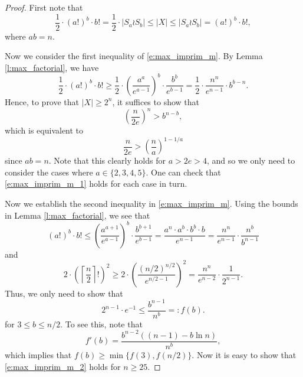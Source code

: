 \documentclass[twoside,a4paper,reqno,11pt]{amsart}
\newcommand{\<}{\langle}
\renewcommand{\>}{\rangle}
\newcommand{\leqs}{\leqslant}
\newcommand{\geqs}{\geqslant}
\theoremstyle{definition}
\begin{document}
	\begin{proof}
		First note that
		\begin{equation*}
		\frac{1}{2}\cdot (a!)^b\cdot b! = \frac{1}{2}\cdot|S_a\wr S_b|\leqs |X|\leqs |S_a\wr S_b| = (a!)^b\cdot b!,
		\end{equation*}
		where $ab = n$.
		
		Now we consider the first inequality of \eqref{e:max_imprim_m}. By Lemma \ref{l:max_factorial}, we have
		\begin{equation*}
		\frac{1}{2}\cdot (a!)^b\cdot b! \geqs \frac{1}{2}\cdot\left(\frac{a^a}{e^{a-1}}\right)^b\cdot \frac{b^b}{e^{b-1}} = \frac{1}{2}\cdot \frac{n^n}{e^{n-1}}\cdot b^{b-n}.
		\end{equation*}
		Hence, to prove that $|X|\geqs 2^n$, it suffices to show that
		\begin{equation*}
		\left(\frac{n}{2e}\right)^n > b^{n-b},
		\end{equation*}
		which is equivalent to
		\begin{equation}
		\label{e:max_imprim_m_1}
		\frac{n}{2e} > \left(\frac{n}{a}\right)^{1-1/a}
		\end{equation}
		since $ab = n$.	Note that this clearly holds for $a > 2e > 4$, and so we only need to consider the cases where $a \in\{2,3,4,5\}$. One can check that \eqref{e:max_imprim_m_1} holds for each case in turn.
		
		Now we establish the second inequality in \eqref{e:max_imprim_m}. Using the bounds in Lemma \ref{l:max_factorial}, we see that
		\begin{equation*}
		(a!)^b\cdot b!\leqs \left(\frac{a^{a+1}}{e^{a-1}}\right)^b\cdot\frac{b^{b+1}}{e^{b-1}} = \frac{a^n\cdot a^b\cdot b^b\cdot b}{e^{n-1}} = \frac{n^n}{e^{n-1}}\cdot \frac{n^b}{b^{n-1}}
		\end{equation*}
		and
		\begin{equation*}
		2\cdot\left(\left\lceil\frac{n}{2}\right\rceil!\right)^2 \geqs 2\cdot\left(\frac{(n/2)^{n/2}}{e^{n/2-1}}\right)^2 = \frac{n^n}{e^{n-2}}\cdot \frac{1}{2^{n-1}}.
		\end{equation*}
		Thus, we only need to show that
		\begin{equation}
		\label{e:max_imprim_m_2}
		2^{n-1}\cdot e^{-1} \leqs \frac{b^{n-1}}{n^b}=:f(b).
		\end{equation}
		for $3\leqs b\leqs n/2$. To see this, note that
		\begin{equation*}
		f'(b) = \frac{b^{n-2}((n-1)-b\ln n)}{n^b},
		\end{equation*}
		which implies that $f(b)\geqs \min\{f(3),f(n/2)\}$. Now it is easy to show that \eqref{e:max_imprim_m_2} holds for $n\geqs 25$.
		

\end{proof}
\end{document}
